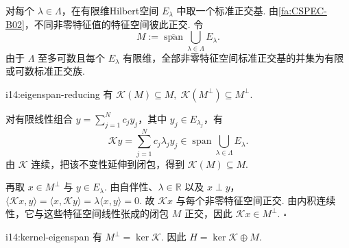 对每个 \(\displaystyle \lambda\in\Lambda\)，在有限维Hilbert空间 \(\displaystyle E_\lambda\) 中取一个标准正交基. 由\autoref{fa:CSPEC-B02}，不同非零特征值的特征空间彼此正交. 令
\[
M
:=
\overline{\operatorname{span}}
\bigcup_{\lambda\in\Lambda}E_\lambda.
\]
由于 \(\displaystyle \Lambda\) 至多可数且每个 \(\displaystyle E_\lambda\) 有限维，全部非零特征空间标准正交基的并集为有限或可数标准正交族.

\begin{FAProposition}[B][非零特征张成空间为约化子空间]{i14:eigenspan-reducing}
有
\(\displaystyle \mathcal K(M) \subseteq M, \; \mathcal K(M^\perp) \subseteq M^\perp\).
\end{FAProposition}

\begin{FAProof}
对有限线性组合 \(\displaystyle y=\sum_{j=1}^N c_jy_j\)，其中 \(\displaystyle y_j\in E_{\lambda_j}\)，有
\[
\mathcal Ky
=
\sum_{j=1}^N c_j\lambda_jy_j
\in
\operatorname{span}\bigcup_{\lambda\in\Lambda}E_\lambda.
\]
由 \(\displaystyle \mathcal K\) 连续，把该不变性延伸到闭包，得到 \(\displaystyle \mathcal K(M)\subseteq M\).

再取 \(\displaystyle x\in M^\perp\) 与 \(\displaystyle y\in E_\lambda\). 由自伴性、\(\displaystyle \lambda\in\mathbb R\) 以及 \(\displaystyle x\perp y\)，
\(\displaystyle \langle\mathcal Kx,y\rangle = \langle x,\mathcal Ky\rangle = \lambda\langle x,y\rangle = 0\).
故 \(\displaystyle \mathcal Kx\) 与每个非零特征空间正交. 由内积连续性，它与这些特征空间线性张成的闭包 \(\displaystyle M\) 正交，因此 \(\displaystyle \mathcal Kx\in M^\perp\).
\hfill\(\square\)
\end{FAProof}

\begin{FATheorem}[B][核等于非零特征张成的正交补]{i14:kernel-eigenspan}
有
\(\displaystyle M^\perp = \ker\mathcal K\).
因此
\(\displaystyle H = \ker\mathcal K \oplus M\).
\end{FATheorem}

